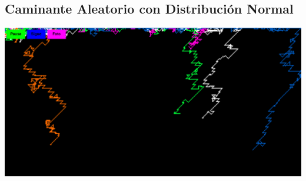 \documentclass[11pt]{article} %
\begin{document}
	 \subsection{Caminante Aleatorio con Distribución Normal}
	 \begin{center}
	 	\includegraphics[width=0.65\linewidth]{walkerNormal.png}
	 	\label{walkerNormal}
	 \end{center}
	 
 
\end{document}
